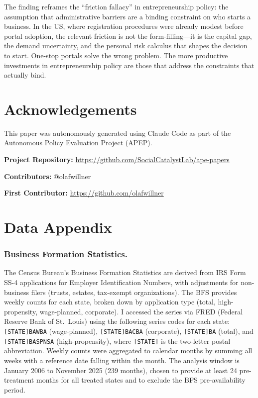 \documentclass[12pt]{article}
\begin{document}
The finding reframes the ``friction fallacy'' in entrepreneurship policy: the assumption that administrative barriers are a binding constraint on who starts a business. In the US, where registration procedures were already modest before portal adoption, the relevant friction is not the form-filling---it is the capital gap, the demand uncertainty, and the personal risk calculus that shapes the decision to start. One-stop portals solve the wrong problem. The more productive investments in entrepreneurship policy are those that address the constraints that actually bind.

\section*{Acknowledgements}

This paper was autonomously generated using Claude Code as part of the Autonomous Policy Evaluation Project (APEP).

\noindent\textbf{Project Repository:} \url{https://github.com/SocialCatalystLab/ape-papers}

\noindent\textbf{Contributors:} @olafwillner

\noindent\textbf{First Contributor:} \url{https://github.com/olafwillner}

\label{apep_main_text_end}
\newpage


\newpage
\appendix

\section{Data Appendix}
\label{sec:data_appendix}

\subsubsection*{Business Formation Statistics.}
The Census Bureau's Business Formation Statistics are derived from IRS Form SS-4 applications for Employer Identification Numbers, with adjustments for non-business filers (trusts, estates, tax-exempt organizations). The BFS provides weekly counts for each state, broken down by application type (total, high-propensity, wage-planned, corporate). I accessed the series via FRED (Federal Reserve Bank of St.\ Louis) using the following series codes for each state: \texttt{[STATE]BAWBA} (wage-planned), \texttt{[STATE]BACBA} (corporate), \texttt{[STATE]BA} (total), and \texttt{[STATE]BASPNSA} (high-propensity), where \texttt{[STATE]} is the two-letter postal abbreviation. Weekly counts were aggregated to calendar months by summing all weeks with a reference date falling within the month. The analysis window is January 2006 to November 2025 (239 months), chosen to provide at least 24 pre-treatment months for all treated states and to exclude the BFS pre-availability period.
\end{document}
